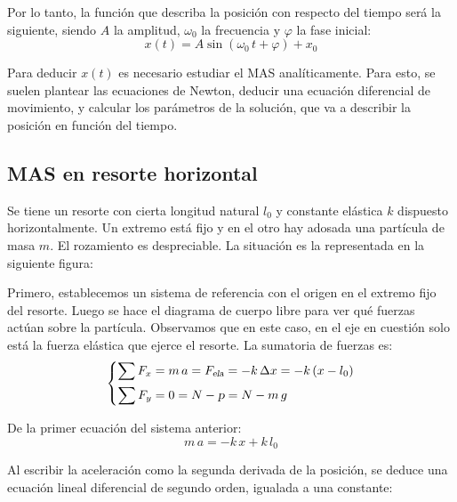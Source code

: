 \documentclass[a5paper,12pt,twoside]{book}
\begin{document}
Por lo tanto, la función que describa la posición con respecto del tiempo será la siguiente, siendo $A$ la amplitud, $\omega_0$ la frecuencia y $\varphi$ la fase inicial:
\[
  x(t) = A \sin{(\omega_0 \, t + \varphi)} + x_0
\]

Para deducir $x(t)$ es necesario estudiar el MAS analíticamente. Para esto, se suelen plantear las ecuaciones de Newton, deducir una ecuación diferencial de movimiento, y calcular los parámetros de la solución, que va a describir la posición en función del tiempo.


\subsection{MAS en resorte horizontal}
\label{sec:horizontalSpring}

Se tiene un resorte con cierta longitud natural $l_0$ y constante elástica $k$ dispuesto horizontalmente. Un extremo está fijo y en el otro hay adosada una partícula de masa $m$. El rozamiento es despreciable. La situación es la representada en la siguiente figura:

\begin{center}
    \vspace{-2cm}
    \def\svgwidth{0.7\linewidth}
    
    \vspace{-2cm}
\end{center}

Primero, establecemos un sistema de referencia con el origen en el extremo fijo del resorte. Luego se hace el diagrama de cuerpo libre para ver qué fuerzas actúan sobre la partícula. Observamos que en este caso, en el eje en cuestión solo está la fuerza elástica que ejerce el resorte. La sumatoria de fuerzas es:
\begin{equation*}
    \left\{
    \begin{aligned}
        \sum F_x &= m \, a = {{F}_\textsl{{ela}}} = - k \, \Delta x = - k \left(x-l_0\right)
        \\
        \sum F_y &= 0 = N - \textsl{p} = N - m \, g
    \end{aligned}
    \right.
\end{equation*}

De la primer ecuación del sistema anterior:
\begin{equation*}
    m \, a = -k \, x + k \, l_0
\end{equation*}

Al escribir la aceleración como la segunda derivada de la posición, se deduce una ecuación lineal diferencial de segundo orden, igualada a una constante:
\end{document}
